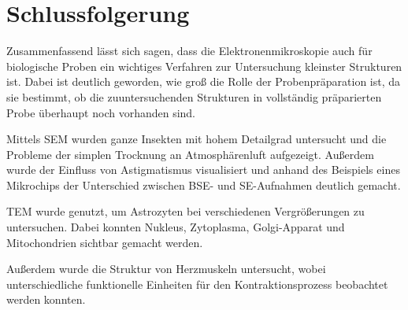 \newpage
\newpage
\section{Schlussfolgerung}

  Zusammenfassend lässt sich sagen, dass die Elektronenmikroskopie auch für biologische Proben ein wichtiges Verfahren  zur Untersuchung kleinster Strukturen ist.
  Dabei ist deutlich geworden, wie groß die Rolle der Probenpräparation ist, da sie bestimmt, ob die zuuntersuchenden Strukturen in vollständig präparierten Probe überhaupt noch vorhanden sind.

  Mittels SEM wurden ganze Insekten mit hohem Detailgrad untersucht und die Probleme der simplen Trocknung an Atmosphärenluft aufgezeigt.
  Außerdem wurde der Einfluss von Astigmatismus visualisiert und anhand des Beispiels eines Mikrochips der Unterschied zwischen BSE- und SE-Aufnahmen deutlich gemacht.

  TEM wurde genutzt, um Astrozyten bei verschiedenen Vergrößerungen zu untersuchen.
  Dabei konnten Nukleus, Zytoplasma, Golgi-Apparat und Mitochondrien sichtbar gemacht werden.

  Außerdem wurde die Struktur von Herzmuskeln untersucht, wobei unterschiedliche funktionelle Einheiten für den Kontraktionsprozess beobachtet werden konnten.
